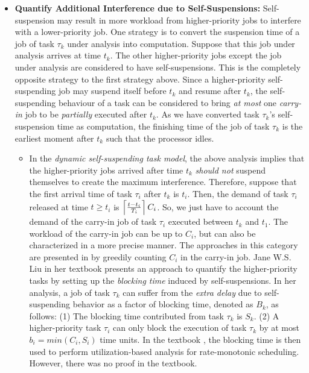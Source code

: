 \begin{itemize}
\item {\bf Quantify Additional Interference due to Self-Suspensions:} Self-suspension may result in more workload from higher-priority jobs to interfere with a lower-priority job. One strategy is to convert the suspension time of a job of task $\tau_k$ under analysis into computation. Suppose that this job under analysis arrives at time $t_k$. The other higher-priority jobs except the job under analysis are considered to have self-suspensions. This is the completely opposite strategy to the first strategy above. Since a higher-priority self-suspending job may suspend itself before $t_k$ and resume after $t_k$, the self-suspending behaviour of a task can be considered to bring \emph{at most} one \emph{carry-in} job to be \emph{partially} executed after $t_k$. As we have converted task $\tau_k$'s self-suspension time as computation, the finishing time of the job of task $\tau_k$ is the earliest moment after $t_k$ such that the processor idles. 
\begin{itemize}
\item In the \emph{dynamic self-suspending task model}, the above analysis implies that the higher-priority jobs arrived after time $t_k$ \emph{should not} suspend themselves to create the maximum interference. Therefore, suppose that the first arrival time of task $\tau_i$ after $t_k$ is $t_i$. Then, the demand of task $\tau_i$ released at time $t \geq t_i$ is $\left\lceil{\frac{t-t_i}{T_i} }\right\rceil C_i$. So, we just have to account the demand of the carry-in job of task $\tau_i$ executed between $t_k$ and $t_1$. The workload of the carry-in job can be up to $C_i$, but can also be characterized in a more precise manner. The approaches in this category are presented in \cite{huangpass:dac2015,LiuChen:rtss2014} by greedily counting $C_i$ in the carry-in job. Jane W.S. Liu in her textbook \cite[Page 268-269]{Liu:2000:RS:518501} presents an approach to quantify the higher-priority tasks by setting up the \emph{blocking time} induced by self-suspensions. In her analysis, a job of task $\tau_k$ can suffer from the \emph{extra delay} due to self-suspending behavior as a factor of blocking time, denoted as $B_k$, as follows: (1) The blocking time contributed from task $\tau_k$ is $S_k$. (2) A higher-priority task $\tau_i$ can only block the execution of task $\tau_k$ by at most $b_i=min(C_i, S_i)$ time units. In the textbook \cite{Liu:2000:RS:518501}, the blocking time is then used to perform utilization-based analysis for rate-monotonic scheduling. However, there was no proof in the textbook.


\end{itemize}
\end{itemize}
